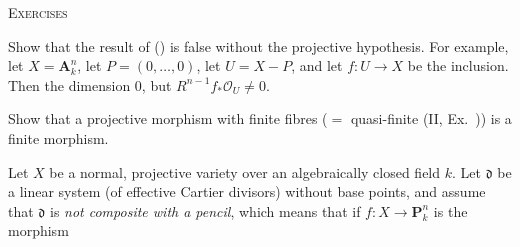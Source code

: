 {\par\smallskip\noindent\textsc{Exercises}\par
{} Show that the result of () is false without the projective hypothesis. For example, let $X=\mathbf A_k^n$\EditionText{}, let $P=(0,\ldots,0)$, let $U=X-P$, and let $f\colon U\to X$ be the inclusion. Then the  dimension $0$, but $R^{n-1}f_*\mathcal O_U\ne0$.

 Show that a projective morphism with finite fibres ($=$ quasi-finite (II, Ex.~)) is a finite morphism.

 Let $X$ be a normal, projective variety over an algebraically closed field $k$. Let $\mathfrak d$ be a linear system (of effective Cartier divisors) without base points, and assume that $\mathfrak d$ is \emph{not composite with a pencil}, which means that if $f\colon X\to\mathbf P_k^n$ is the morphism
}

